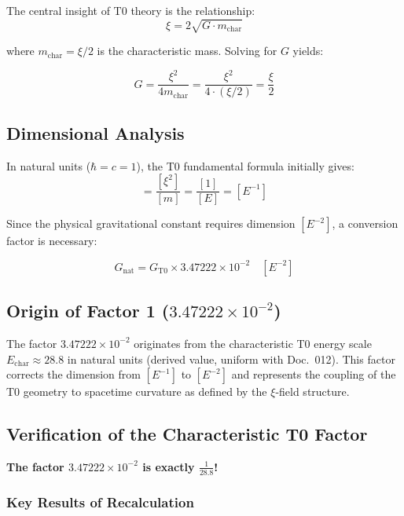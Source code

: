 	The central insight of T0 theory is the relationship:
	\begin{equation}
		\xi = 2\sqrt{G \cdot m_{\text{char}}}
	\end{equation}
	
	where $m_{\text{char}} = \xi/2$ is the characteristic mass. Solving for $G$ yields:
	
	\begin{equation}
		\boxed{G = \frac{\xi^2}{4m_{\text{char}}} = \frac{\xi^2}{4 \cdot (\xi/2)} = \frac{\xi}{2}}
	\end{equation}
	
	\subsection{Dimensional Analysis}
	
	In natural units ($\hbar = c = 1$), the T0 fundamental formula initially gives:
	\begin{equation}
		[G_{\text{T0}}] = \frac{[\xi^2]}{[m]} = \frac{[1]}{[E]} = [E^{-1}]
	\end{equation}
	
	Since the physical gravitational constant requires dimension $[E^{-2}]$, a conversion factor is necessary:
	
	\begin{equation}
		G_{\text{nat}} = G_{\text{T0}} \times 3.47222 \times 10^{-2} \quad [E^{-2}]
	\end{equation}
	
	\subsection{Origin of Factor 1 ($3.47222 \times 10^{-2}$)}

	The factor $3.47222 \times 10^{-2}$ originates from the characteristic T0 energy scale $E_{\text{char}} \approx 28.8$ in natural units (derived value, uniform with Doc.~012). This factor corrects the dimension from $[E^{-1}]$ to $[E^{-2}]$ and represents the coupling of the T0 geometry to spacetime curvature as defined by the $\xi$-field structure.
	
	\subsection{Verification of the Characteristic T0 Factor}
	
	\textbf{The factor $3.47222 \times 10^{-2}$ is exactly $\frac{1}{28.8}$!}
	
	\subsubsection{Key Results of Recalculation}
	

